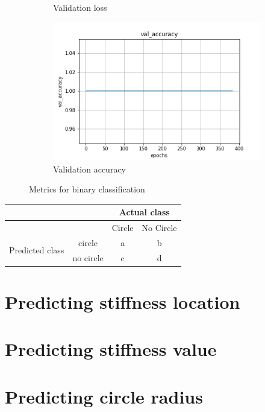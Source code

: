 \documentclass{article}
\begin{document}
\begin{figure}
\begin{subfigure}[b]{0.45\textwidth}
    \caption{Validation loss}
  \end{subfigure}
%
\begin{subfigure}[b]{0.45\textwidth}
    \centering
    \includegraphics[totalheight=4cm]{circle_id/binary_plotval_accuracy.png}
    \caption{Validation accuracy}
  \end{subfigure}
\caption{\label{fig:binarymetrics} Metrics for binary classification}
\end{figure}
%
\begin{center}
  \begin{tabular}{|cccc}
    \hline
    & & \multicolumn{2}{|c|}{Actual class}  \\
    \hline
    & & \multicolumn{1}{|c|}{Circle} &  \multicolumn{1}{|c|}{No Circle}\\
    \hline
    \multirow{2}{4em}{Predicted class} & \multicolumn{1}{|c|}{circle} & a & b \\
    & no circle & c & d
  \end{tabular}
\end{center}
\section{Predicting stiffness location}
%
\section{Predicting stiffness value}
%
\section{Predicting circle radius}
%
\end{document}
